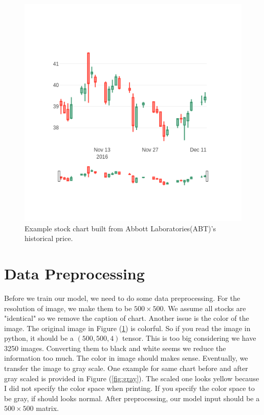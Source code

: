 \documentclass[12pt]{article}
\begin{document}
\begin{figure}[h]
	\centering
	\includegraphics[scale=0.8]{ABT}
	\caption{Example stock chart built from Abbott Laboratories(ABT)'s historical price.}
	\label{fig:chart}
\end{figure}

\section{Data Preprocessing}
Before we train our model, we need to do some data preprocessing. For the resolution of image, we make them to be $500\times500$. We assume all stocks are "identical" so we remove the caption of chart. Another issue is the color of the image. The original image in Figure (\ref{fig:chart}) is colorful. So if you read the image in python, it should be a $(500, 500, 4)$ tensor. This is too big considering we have 3250 images. Converting them to black and white seems we reduce the information too much. The color in image should makes sense. Eventually, we transfer the image to gray scale. One example for same chart before and after gray scaled is provided in Figure (\ref{fig:gray}). The scaled one looks yellow because I did not specify the color space when printing. If you specify the color space to be gray, if should looks normal. After preprocessing, our model input should be a $500\times500$ matrix.
\end{document}
